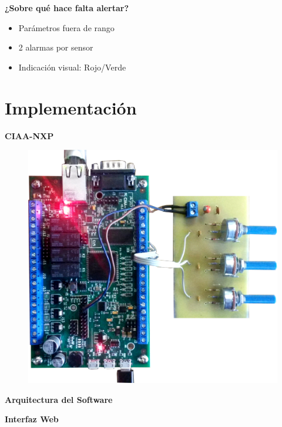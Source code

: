 \documentclass[11pt]{beamer}
\newcommand\Wider[2][3em]{%
  \makebox[\linewidth][c]{%
    \begin{minipage}{\dimexpr\textwidth+#1\relax}
      \raggedright#2
    \end{minipage}%
  }%
}
\begin{document}
\begin{frame}{\textbf{\LARGE{¿Sobre qué hace falta alertar?}}}
  \fontsize{18pt}{18}\selectfont
  \begin{itemize}
    \item Parámetros fuera de rango
      \vspace{20px}
    \item 2 alarmas por sensor
      \vspace{20px}
    \item Indicación visual: Rojo/Verde
  \end{itemize}	
\end{frame}


\section{Implementación}

\begin{frame}{\textbf{\LARGE{CIAA-NXP}}}
  \vspace{-.7cm}
  \begin{figure}[H]
    {\includegraphics[width=.7\textwidth]{./imagenes/ciaa.png}}
  \end{figure}	
\end{frame}

\begin{frame}{\textbf{\LARGE{Arquitectura del Software}}}
\end{frame}

\begin{frame}{\textbf{\LARGE{Interfaz Web}}}
  \Wider{
    \begin{figure}[H]
    \end{figure}	  	  	
  }
\end{frame}
\end{document}
